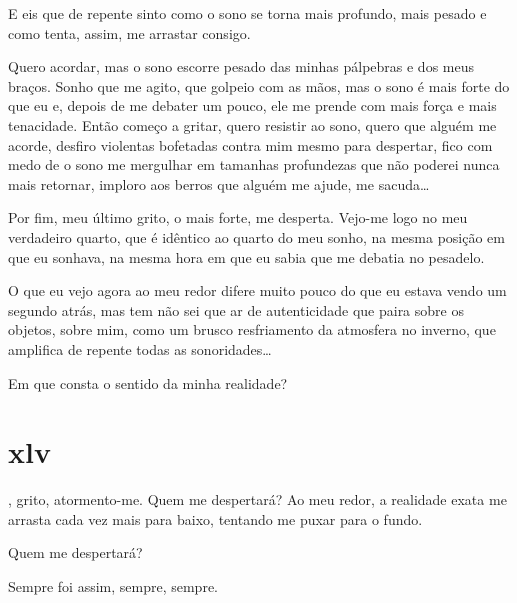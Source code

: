 E eis que de repente sinto como o sono se torna mais profundo, mais pesado e
como tenta, assim, me arrastar consigo.

Quero acordar, mas o sono escorre pesado das minhas pálpebras e dos meus
braços. Sonho que me agito, que golpeio com as mãos, mas o sono é mais forte
do que eu e, depois de me debater um pouco, ele me prende com mais força e
mais tenacidade. Então começo a gritar, quero resistir ao sono, quero que
alguém me acorde, desfiro violentas bofetadas contra mim mesmo para
despertar, fico com medo de o sono me mergulhar em tamanhas profundezas que
não poderei nunca mais retornar, imploro aos berros que alguém me ajude, me
sacuda\ldots{}

Por fim, meu último grito, o mais forte, me desperta. Vejo-me logo no meu
verdadeiro quarto, que é idêntico ao quarto do meu sonho, na mesma posição em
que eu sonhava, na mesma hora em que eu sabia que me debatia no pesadelo.

O que eu vejo agora ao meu redor difere muito pouco do que eu estava vendo um
segundo atrás, mas tem não sei que ar de autenticidade que paira sobre os
objetos, sobre mim, como um brusco resfriamento da atmosfera no inverno, que
amplifica de repente todas as sonoridades\ldots{}

Em que consta o sentido da minha realidade?


\section{xlv} 

, grito, atormento-me. Quem me despertará?
Ao meu redor, a realidade exata me arrasta cada vez mais para baixo, tentando
me puxar para o fundo.

Quem me despertará?

Sempre foi assim, sempre, sempre.